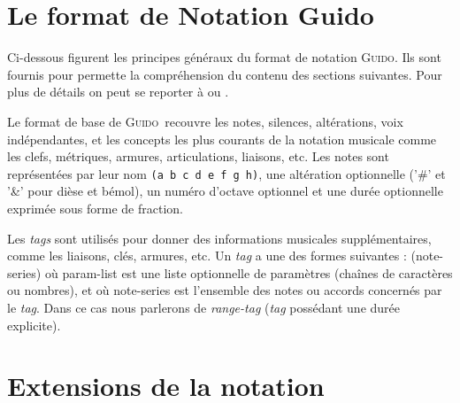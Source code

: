 \documentclass{article}
\newenvironment{gmncode}	{\vspace{-2mm}\small\verbatim}{\endverbatim\vspace{-2mm}}
\newcommand{\guido}			{\textsc{Guido}}
\begin{document}
\section{Le format de Notation Guido}\label{sec:format_notation}

Ci-dessous figurent les principes généraux du format de notation \guido . Ils sont fournis pour permette la compréhension du contenu des sections suivantes. Pour plus de détails on peut se reporter à \cite{Dau:09a} ou \cite{guido}.

Le format de base de \guido\ recouvre les notes, silences, altérations, voix indépendantes, et les concepts les plus courants de la notation musicale comme les clefs, métriques, armures, articulations, liaisons, etc.
Les notes sont représentées par leur nom \texttt{(a b c d e f g h)}, une altération optionnelle ('\#' et '\&' pour dièse et bémol), un numéro d'octave optionnel et une durée optionnelle exprimée sous forme de fraction.



Les \emph{tags} sont utilisés pour donner des informations musicales supplémentaires, comme les liaisons, clés, armures, etc. Un \emph{tag} a une des formes suivantes : 
\begin{gmncode}
    (note-series)
\end{gmncode}
où param-list est une liste optionnelle de paramètres (chaînes de caractères ou nombres), et où note-series est l'ensemble des notes ou accords concernés par le \emph{tag}. Dans ce cas nous parlerons de \emph{range-tag} (\emph{tag} possédant une durée explicite).


\section{Extensions de la notation}\label{sec:extension}
\end{document}
